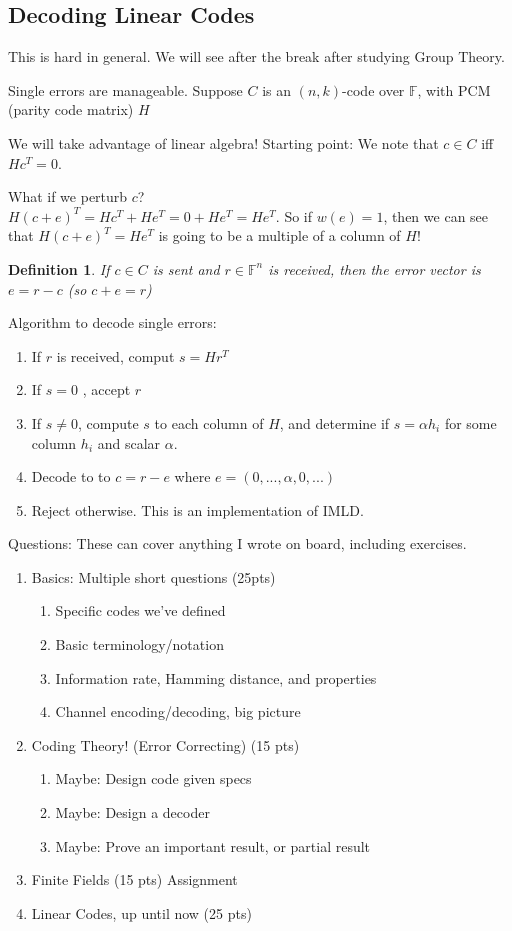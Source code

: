\documentclass{article}
\newtheorem{defn}{Definition}
\begin{document}
\subsection{Decoding Linear Codes}
This is hard in general. We will see after the break after studying Group
Theory.

Single errors are manageable. Suppose $C$ is an $(n,k)$-code over $\mathbb{F}$, with
PCM (parity code matrix) $H$

We will take advantage of linear algebra! Starting point: We note that
$c\in C$ iff $Hc^T = 0$.

What if we perturb $c$?\\
$H(c+e)^T = Hc^T + He^T = 0 + He^T = He^T$. So if
$w(e) = 1$, then we can see that $H(c+e)^T = He^T$ is going to be a multiple of
a column of $H$!

\begin{defn}
    If $c\in C$ is sent and $r\in\mathbb{F}^n$ is received, then the error vector
    is $e = r-c$ (so $c+e = r$)
\end{defn}

Algorithm to decode single errors:
\begin{enumerate}
    \item If $r$ is received, comput $s = Hr^T$
    \item If $s = 0$ , accept $r$
    \item If $s \ne 0$, compute $s$ to each column of $H$, and determine if
        $s = \alpha h_i$ for some column $h_i$ and scalar $\alpha$.
    \item Decode to to $c = r - e$ where $e = (0, ..., \alpha, 0, ...)$
    \item Reject otherwise. This is an implementation of IMLD.
\end{enumerate}

Questions: These can cover anything I wrote on board, including exercises.
\begin{enumerate}
    \item Basics: Multiple short questions (25pts)
        \begin{enumerate}
            \item Specific codes we've defined
            \item Basic terminology/notation
            \item Information rate, Hamming distance, and properties
            \item Channel encoding/decoding, big picture
        \end{enumerate}
    \item Coding Theory! (Error Correcting) (15 pts)
        \begin{enumerate}
            \item Maybe: Design code given specs
            \item Maybe: Design a decoder
            \item Maybe: Prove an important result, or partial result
        \end{enumerate}
    \item Finite Fields (15 pts) Assignment
    \item Linear Codes, up until now (25 pts)
\end{enumerate}
\end{document}
